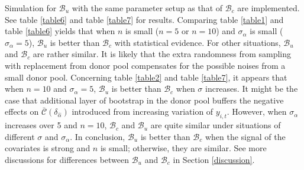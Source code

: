 \documentclass[11pt]{article}
\def\mc#1{\mathcal{#1}} %
\theoremstyle{definition}
\begin{document}
Simulation for $\mc{B}_u$ with the same parameter setup as that of $\mc{B}_c$ are implemented. See table \ref{table6} and table \ref{table7} for results. Comparing table \ref{table1}
 and table \ref{table6} yields that when $n$ is small ($n = 5$ or $n = 10$) and $\sigma_{\alpha}$ is small ($\sigma_{\alpha}=5$), $\mc{B}_u$ is better than $\mc{B}_c$ with statistical evidence. For other situations, $\mc{B}_u$  and $\mc{B}_c$  are rather similar. It is likely that the extra randomness from sampling with replacement from donor pool compensates for the possible noises from a small donor pool. Concerning  table \ref{table2} and table \ref{table7}, it appears that when $n = 10$ and $\sigma_{\alpha}=5$, $\mc{B}_u$ is better than  $\mc{B}_c$  when $\sigma$ increases. It might be the case that additional layer of bootstrap in the donor pool buffers the negative effects on $\bar{\mc{C}}(\delta_{\hat{\alpha}})$  introduced from increasing variation of $y_{i,t}$. However, when $\sigma_{\alpha}$ increases over 5 and $n = 10$,  $\mc{B}_c$ and $\mc{B}_u$ are quite similar under  situations of different $\sigma$ and $\sigma_{\alpha}$. In conclusion, $\mc{B}_u$ is better than $\mc{B}_c$ when the signal of the covariates is strong and $n$ is small; otherwise, they are similar. See more discussions for differences between $\mc{B}_u$ and $\mc{B}_c$ in Section \ref{discussion}. 






\end{document}

